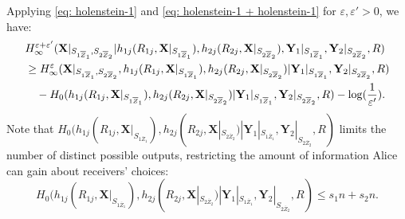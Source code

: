 \documentclass[runningheads]{llncs}
\begin{document}
        Applying \eqref{eq: holenstein-1} and \eqref{eq: holenstein-1 + holenstein-1} for $\varepsilon, \varepsilon'>0$, we have:
        \begin{align}\label{eq: after applying holenstein-1}
        &H^{\varepsilon+\varepsilon'}_{\infty}(\mathbf{X}|_{S_{1\overline{Z}_1},S_{2\overline{Z}_2}}| h_{1j}(R_{1j},\mathbf{X}|_{S_{1\overline{Z}_1}}),   h_{2j}(R_{2j},\mathbf{X}|_{S_{2\overline{Z}_2}}),\mathbf{Y}_1|_{S_{1\overline{Z}_1}},\mathbf{Y}_2|_{S_{2\overline{Z}_2}}, R)\\
        & \geq H_\infty^\varepsilon (\mathbf{X}|_{S_{1\overline{Z}_1},S_{2\overline{Z}_2}},h_{1j}(R_{1j}, \mathbf{X}|_{S_{1\overline{Z}_1}}),h_{2j}(R_{2j}, \mathbf{X}|_{S_{2\overline{Z}_2}})|\mathbf{Y}_1|_{S_{1\overline{Z}_1}},\mathbf{Y}_2|_{S_{2\overline{Z}_2}}, R)\notag\\
        & \quad- H_0(h_{1j}(R_{1j}, \mathbf{X}|_{S_{1\overline{Z}_1}}),h_{2j}(R_{2j}, \mathbf{X}|_{S_{2\overline{Z}_2}})|\mathbf{Y}_1|_{S_{1\overline{Z}_1}},\mathbf{Y}_2|_{S_{2\overline{Z}_2}}, R) - \log(\frac{1}{\varepsilon'}).
        \end{align}
Note that $H_0(h_{1j}(R_{1j}, \mathbf{X}|_{S_{1\overline{Z}_1}}),h_{2j}(R_{2j}, \mathbf{X}|_{S_{2\overline{Z}_2}})|\mathbf{Y}_1|_{S_{1\overline{Z}_1}},\mathbf{Y}_2|_{S_{2\overline{Z}_2}}, R)$ limits the number of distinct possible outputs, restricting the amount of information Alice can gain about receivers' choices: 
        \[
        H_0(h_{1j}(R_{1j}, \mathbf{X}|_{S_{1\overline{Z}_1}}),h_{2j}(R_{2j}, \mathbf{X}|_{S_{2\overline{Z}_2}})|\mathbf{Y}_1|_{S_{1\overline{Z}_1}},\mathbf{Y}_2|_{S_{2\overline{Z}_2}}, R)\leq s_1 n + s_2 n.
        \]
        
\end{document}
